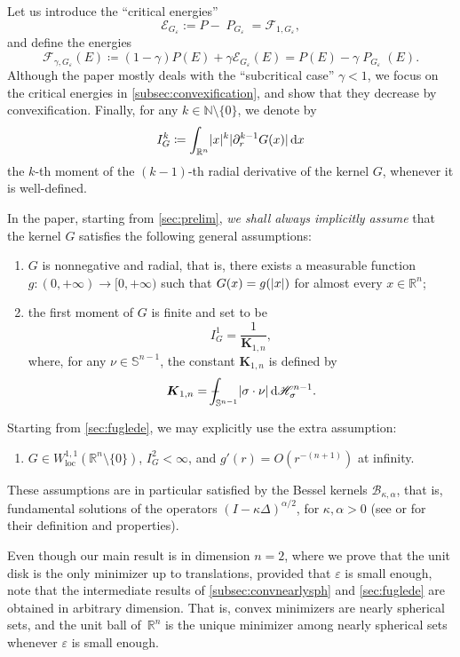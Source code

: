 \documentclass[JEP,XML,SOM,Unicode,published]{cedram}
\newcommand{\enquote}[1]{``#1''}
\numberwithin{equation}{section}
\theoremstyle{plain}
\theoremstyle{definition}
\newcommand{\numberset}[1]{{\mathbb{#1}}}
\newcommand{\N}{\numberset{N}}
\newcommand{\R}{\numberset{R}}
\newcommand{\dx}{\mathop{}\mathopen{}\mathrm{d}x}
\newcommand{\dH}{\mathop{}\mathopen{}\mathrm{d}\mathscr{H}}
\newcommand{\bbS}{\mathbb{S}}
\newcommand{\bfK}{\boldsymbol{K}}
\newcommand{\calE}{{\mathcal{E}}}
\newcommand{\calF}{{\mathcal{F}}}
\let\eps\varepsilon
\newcommand{\Ren}{{\R^n}}
\newcommand{\loc}{{\mathrm{loc}}}
\DeclareMathOperator{\Per}{\mathit{P}}
\DeclarePairedDelimiter{\abs}{\lvert}{\rvert}
\def\Xint#1{\mathchoice
{\XXint\displaystyle\textstyle{#1}}%
{\XXint\textstyle\scriptstyle{#1}}%
{\XXint\scriptstyle\scriptscriptstyle{#1}}%
{\XXint\scriptscriptstyle
\scriptscriptstyle{#1}}%
\!\int}
\def\XXint#1#2#3{{%
\setbox0=\hbox{$#1{#2#3}{\int}$}
\vcenter{\hbox{$#2#3$}}\kern-.5\wd0}}
\def\dashint{\Xint-}
\begin{document}
Let us introduce the \enquote{critical energies}
\[
\calE_{G_\eps}:=P-\Per_{G_\eps}=\calF_{1,G_\eps},
\]
and define the energies
\begin{equation}\label{eq:defF}
\calF_{\gamma,G_\eps}(E)
\coloneqq (1-\gamma) P(E)+\gamma\calE_{G_\eps}(E)
= P(E)-\gamma\Per_{G_\eps}(E).
\end{equation}
Although the paper mostly deals with the \enquote{subcritical case} $\gamma<1$, we focus on the
critical energies in \cref{subsec:convexification}, and show that they decrease by convexification.
Finally, for any $k\in\N\setminus\{0\}$, we denote by
\begin{equation}\label{defmom}
I_G^{k} \coloneqq \int_{\Ren} \abs{x}^{k}\abs{\partial_r^{k-1} G(x)}\dx
\end{equation}
the $k$-th moment of the $(k-1)$-th radial derivative of the kernel $G$, whenever it is
well-defined.

In the paper, starting from \cref{sec:prelim}, \emph{we shall always implicitly assume} that the
kernel $G$ satisfies the following general assumptions:
\begin{enumerate}\renewcommand{\theenumi}{H.\arabic{enumi}}
\item\label{Hrad} $G$ is nonnegative and radial, that is, there exists a measurable function
$g:(0,+\infty)\to[0,+\infty)$ such that $G(x)=g(\abs{x})$ for almost every $x\in\Ren$;
\item\label{Hint} the first moment of $G$ is finite and set to be
\[
I_G^1 = \frac{1}{\bfK_{1,n}},
\]
where, for any $\nu\in\bbS^{n-1}$, the constant $\bfK_{1,n}$ is defined by
\[
\bfK_{1,n}=\dashint_{\bbS^{n-1}} \abs{\sigma\cdot \nu}\dH^{n-1}_\sigma.
\]
\end{enumerate}
Starting from \cref{sec:fuglede}, we may explicitly use the extra assumption:
\begin{enumerate}\renewcommand{\theenumi}{H.\arabic{enumi}}
\setcounter{enumi}{2}
\item\label{Hhighermoments} $G\in W^{1,1}_\loc(\Ren\setminus\{0\})$, $I_G^2<\infty$, and
$g'(r)=O(r^{-(n+1)})$ at infinity.
\end{enumerate}

These assumptions are in particular satisfied by the Bessel kernels $\mathcal{B}_{\kappa,\alpha}$,
that is, fundamental solutions of the operators $(I-\kappa\Delta)^{\alpha/2}$, for
$\kappa,\alpha>0$ (see \eg \cite[\S 3.2]{Peg2021} or \cite{Gra2014} for their definition
and properties).

Even though our main result is in dimension $n=2$, where we prove that the unit disk is the
only minimizer up to translations, provided that $\eps$ is small enough, note that the intermediate
results of \cref{subsec:convnearlysph} and \cref{sec:fuglede} are obtained in arbitrary dimension.
That is, convex minimizers are nearly spherical sets, and the unit ball of~$\Ren$ is the unique
minimizer among nearly spherical sets whenever $\eps$ is small enough.
\end{document}
